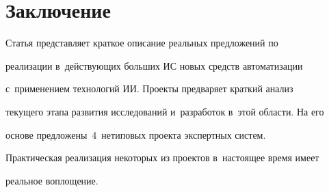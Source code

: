 \vspace*{-4pt}



\section{Заключение}



\vspace*{-2pt}



     Статья представляет краткое описание реальных предложений по 

реализации в~действующих больших ИС новых средств автоматизации 

с~применением технологий ИИ. Проекты предваряет краткий анализ 

текущего этапа развития исследований и~разработок в~этой области. На его 

основе предложены~4~нетиповых проекта экспертных систем. 

Практическая реализация некоторых из проектов в~настоящее время имеет 

реальное воплощение.



\vspace*{-4pt}



